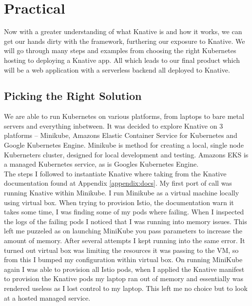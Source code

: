 \section{Practical}
Now with a greater understanding of what Knative is and how it works, we can get our hands dirty with the framework, furthering our exposure to Knative. We will go through many steps and examples from choosing the right Kubernetes hosting to deploying a Knative app. All which leads to our final product which will be a web application with a serverless backend all deployed to Knative.

\subsection{Picking the Right Solution}
We are able to run Kubernetes on various platforms, from laptops to bare metal servers and everything inbetween. It was decided to explore Knative on 3 platforms -- Minikube, Amazons Elastic Container Service for Kubernetes and Google Kubernetes Engine. Minikube is method for creating a local, single node Kuberneters cluster, designed for local development and testing. Amazons EKS is a managed Kubernetes service, as is Googles Kubernetes Engine.
\\The steps I followed to instantiate Knative where taking from the Knative documentation found at Appendix \ref{appendix:docs}. My first port of call was running Knative within Minikube. I run Minikube as a virtual machine locally using virtual box. When trying to provision Istio, the documentation warn it takes some time, I was finding some of my pods where failing. When I inspected the logs of the failing pods I noticed that I was running into memory issues. This left me puzzeled as on launching MiniKube you pass parameters to increase the amount of memory. After several attempts I kept running into the same error. It turned out virtual box was limiting the resources it was passing to the VM, so from this I bumped my configuration within virtual box. On running MiniKube again I was able to provision all Istio pods, when I applied the Knative manifest to provision the Knative pods my laptop ran out of memory and essentially was rendered useless as I lost control to my laptop. This left me no choice but to look at a hosted managed service.
